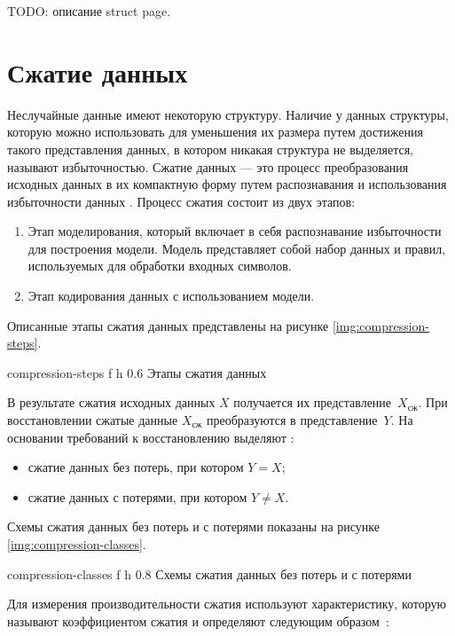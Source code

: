 TODO: описание struct page.

\section{Сжатие данных}

Неслучайные данные имеют некоторую структуру. Наличие у данных структуры, которую можно использовать для уменьшения их размера путем достижения такого представления данных, в котором никакая структура не выделяется, называют избыточностью. Сжатие данных --- это процесс преобразования исходных данных в их компактную форму путем распознавания и использования избыточности данных \cite{compression-definition}. Процесс сжатия состоит из двух этапов:

\begin{enumerate}
	\item Этап моделирования, который включает в себя распознавание избыточности для построения модели. Модель представляет собой набор данных и правил, используемых для обработки входных символов.
	\item Этап кодирования данных с использованием модели.
\end{enumerate}

Описанные этапы сжатия данных представлены на рисунке \ref{img:compression-steps}.

    {compression-steps}
    {f}
    {h}
    {0.6\textwidth}
    {Этапы сжатия данных}

В результате сжатия исходных данных $X$ получается их представление~$X_{\text{сж}}$. При восстановлении сжатые данные $X_{\text{сж}}$ преобразуются в представление~$Y$. На основании требований к восстановлению выделяют \cite{compression-classes}:

\begin{itemize}
	\item сжатие данных без потерь, при котором $Y = X$;
	\item сжатие данных с потерями, при котором $Y \not= X$.
\end{itemize}

Схемы сжатия данных без потерь и с потерями показаны на рисунке \ref{img:compression-classes}.

    {compression-classes}
    {f}
    {h}
    {0.8\textwidth}
    {Схемы сжатия данных без потерь и с потерями}

Для измерения производительности сжатия используют характеристику, которую называют коэффициентом сжатия и определяют следующим образом~\cite{compression-coefficient}:

